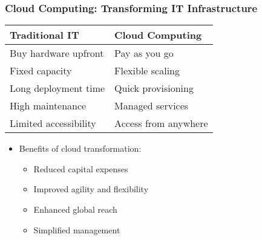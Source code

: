 \documentclass{beamer}
\begin{document}
\begin{frame}
    \frametitle{Cloud Computing: Transforming IT Infrastructure}
    
    \begin{tabular}{|p{}|p{}|}
        \hline
        \textbf{Traditional IT} & \textbf{Cloud Computing} \\
        \hline
        Buy hardware upfront & Pay as you go \\
        \hline
        Fixed capacity & Flexible scaling \\
        \hline
        Long deployment time & Quick provisioning \\
        \hline
        High maintenance & Managed services \\
        \hline
        Limited accessibility & Access from anywhere \\
        \hline
    \end{tabular}
    
    \begin{itemize}
        \item Benefits of cloud transformation:
        \begin{itemize}
            \item Reduced capital expenses
            \item Improved agility and flexibility
            \item Enhanced global reach
            \item Simplified management
        \end{itemize}
    \end{itemize}
\end{frame}
\end{document}
